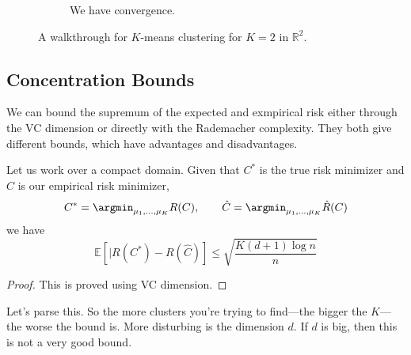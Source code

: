 \begin{example}
\begin{figure}[H]
\begin{subfigure}[b]{0.48\textwidth}
        \caption{We have convergence.}
      \end{subfigure}
      \caption{A walkthrough for $K$-means clustering for $K = 2$ in $\mathbb{R}^2$.}
      \label{fig:kmeans}
    \end{figure}
  \end{example}

\subsection{Concentration Bounds}

  We can bound the supremum of the expected and exmpirical risk either through the VC dimension or directly with the Rademacher complexity. They both give different bounds, which have advantages and disadvantages. 

  \begin{theorem}
    Let us work over a compact domain. Given that $C^\ast$ is the true risk minimizer and $\hat{C}$ is our empirical risk minimizer, 
    \begin{equation}
      C^\ast = \argmin_{\mu_1, \ldots, \mu_K} R(C), \qquad \hat{C} = \argmin_{\mu_1, \ldots, \mu_K} \hat{R}(C) 
    \end{equation}
    we have 
    \begin{equation}
      \mathbb{E} \left[ | R(C^\ast) - R(\hat{C}) \right] \leq \sqrt{\frac{K (d+1) \log{n}}{n}}
    \end{equation}
  \end{theorem}
  \begin{proof}
    This is proved using VC dimension. 
  \end{proof}

  Let's parse this. So the more clusters you're trying to find---the bigger the $K$---the worse the bound is. More disturbing is the dimension $d$. If $d$ is big, then this is not a very good bound. 

